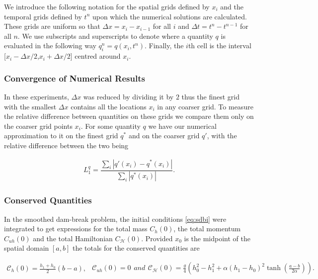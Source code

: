 \documentclass[times]{elsarticle}
\begin{document}
We introduce the following notation for the spatial grids defined by $x_i$ and the temporal grids defined by $t^n$ upon which the numerical solutions are calculated. These grids are uniform so that $\Delta x = x_{i} - x_{i-1}$ for all $ i$ and $\Delta t = t^{n} - t^{n-1}$ for all $n$. We use subscripts and superscripts to denote where a quantity $q$ is evaluated in the following way $q_i^n = q(x_i,t^n)$. Finally, the $i$th cell is the interval [$x_i -\Delta x/2$,$x_i +\Delta x/2$] centred around $x_{i}$. 

\subsubsection{Convergence of Numerical Results}
In these experiments, $\Delta x$ was reduced by dividing it by $2$ thus the finest grid with the smallest $\Delta x$ contains all the locations $x_i$ in any coarser grid. To measure the relative difference between quantities on these grids we compare them only on the coarser grid points $x_i$. For some quantity $q$ we have our numerical approximation to it on the finest grid $q^*$ and on the coarser grid $q'$, with the relative difference between the two being
\begin{linenomath*}
	\begin{gather}
	L_1^{q} = \dfrac{\sum_{i} \left| q'(x_i)  - q^*(x_i)\right|}{\sum_{i} \left| q^*(x_i)\right|}.
	\label{eq:L1def}
	\end{gather}
\end{linenomath*}

\subsubsection{Conserved Quantities}
In the smoothed dam-break problem, the initial conditions \eqref{eq:sdbi} were integrated to get expressions for the total mass $C_{h}(0)$, the total momentum $C_{uh}(0)$ and the total Hamiltonian $C_{\mathcal{H}}(0)$. Provided $x_0$ is the midpoint of the spatial domain $\left[a,b \right]$ the totals for the conserved quantities are
\begin{linenomath*}
	\begin{subequations}
		\begin{gather*}
		\mathcal{C}_{h}(0) = \frac{h_1 + h_0}{2}\left(b- a\right),
		\label{eq:Chdef}
		\end{gather*}
		\begin{gather*}
		\mathcal{C}_{uh}(0) = 0
		\label{eq:Cuhdef}
		\end{gather*}
		and
		\begin{gather*}
		\mathcal{C}_{\mathcal{H}}(0) = \frac{g}{4} \left(h_0^2 - h_1^2 + \alpha\left(h_1 - h_0\right)^2\tanh\left(\frac{a - b}{2 \alpha}\right)\right).
		\label{eq:CHdef}
		\end{gather*}
		\label{eq:Canalyticvalues}	
	\end{subequations}
\end{linenomath*}
\end{document}

